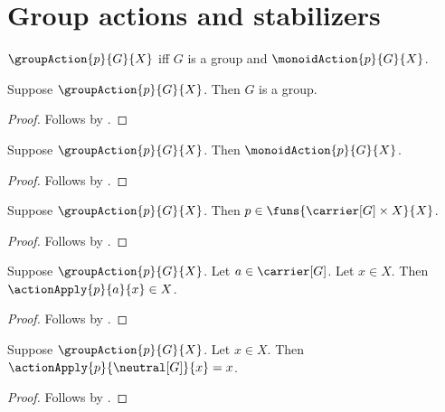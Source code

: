 


\section{Group actions and stabilizers}

\begin{definition}\label{group_action}
    $\groupAction{p}{G}{X}$ iff
        $G$ is a group and $\monoidAction{p}{G}{X}$.
\end{definition}

\begin{proposition}\label{group_action_group}
    Suppose $\groupAction{p}{G}{X}$.
    Then $G$ is a group.
\end{proposition}
\begin{proof}
    Follows by .
\end{proof}

\begin{proposition}\label{group_action_is_monoid_action}
    Suppose $\groupAction{p}{G}{X}$.
    Then $\monoidAction{p}{G}{X}$.
\end{proposition}
\begin{proof}
    Follows by .
\end{proof}

\begin{proposition}\label{group_action_type}
    Suppose $\groupAction{p}{G}{X}$.
    Then $p\in\funs{\carrier[G]\times X}{X}$.
\end{proposition}
\begin{proof}
    Follows by
        .
\end{proof}

\begin{proposition}\label{group_action_apply_type}
    Suppose $\groupAction{p}{G}{X}$.
    Let $a\in\carrier[G]$.
    Let $x\in X$.
    Then $\actionApply{p}{a}{x}\in X$.
\end{proposition}
\begin{proof}
    Follows by
        .
\end{proof}

\begin{proposition}\label{group_action_neutral}
    Suppose $\groupAction{p}{G}{X}$.
    Let $x\in X$.
    Then $\actionApply{p}{\neutral[G]}{x}=x$.
\end{proposition}
\begin{proof}
    Follows by
        .
\end{proof}

